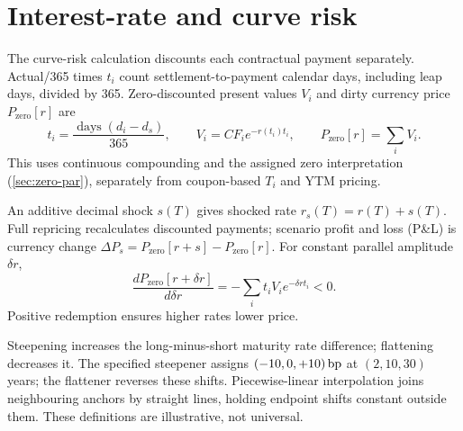 \chapter{Interest-rate and curve risk}\label{ch:risk}
\label{sec:zero-price}
The curve-risk calculation discounts each contractual payment separately. Actual/365 times \(t_i\) count settlement-to-payment calendar days, including leap days, divided by 365. Zero-discounted present values \(V_i\) and dirty currency price \(P_{\mathrm{zero}}[r]\) are
\begin{equation}\label{eq:zero-price}
t_i=\frac{\operatorname{days}(d_i-d_s)}{365},\qquad
V_i=CF_i e^{-r(t_i)t_i},\qquad P_{\mathrm{zero}}[r]=\sum_iV_i.
\end{equation}
This uses continuous compounding and the assigned zero interpretation (\cref{sec:zero-par}), separately from coupon-based \(T_i\) and YTM pricing.

\label{sec:parallel}
An additive decimal shock \(s(T)\) gives shocked rate \(r_s(T)=r(T)+s(T)\). Full repricing recalculates discounted payments; scenario profit and loss (P\&L) is currency change \(\Delta P_s=P_{\mathrm{zero}}[r+s]-P_{\mathrm{zero}}[r]\). For constant parallel amplitude \(\delta r\),
\begin{equation}\label{eq:parallel-sign}
\frac{dP_{\mathrm{zero}}[r+\delta r]}{d\delta r}
=-\sum_i t_iV_i e^{-\delta r t_i}<0.
\end{equation}
Positive redemption ensures higher rates lower price.

\label{sec:shapes}
Steepening increases the long-minus-short maturity rate difference; flattening decreases it. The specified steepener assigns \((-10,0,+10)\,\mathrm{bp}\) at \((2,10,30)\) years; the flattener reverses these shifts. Piecewise-linear interpolation joins neighbouring anchors by straight lines, holding endpoint shifts constant outside them. These definitions are illustrative, not universal.

